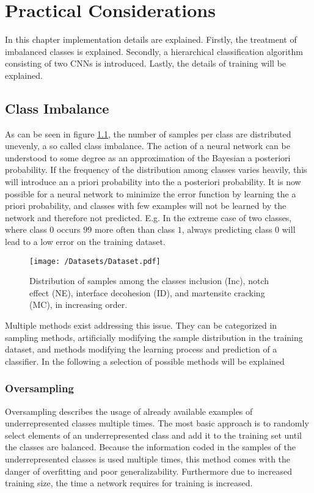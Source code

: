 \chapter{Practical Considerations}
\label{cha:PracticalConsiderations}

In this chapter implementation details are explained. Firstly, the treatment of imbalanced classes is explained. Secondly, a hierarchical classification algorithm consisting of two CNNs is introduced. Lastly, the details of training will be explained. 

\section{Class Imbalance}

As can be seen in figure \ref{fig:datasets}, the number of samples per class are distributed unevenly, a so called class imbalance. The action of a neural network can be understood to some degree as an approximation of the Bayesian a posteriori probability. If the frequency of the distribution among classes varies heavily, this will introduce an a priori probability into the a posteriori probability. It is now possible for a neural network to minimize the error function by learning the a priori probability, and classes with few examples will not be learned by the network and therefore not predicted. E.g. In the extreme case of two classes, where class $0$ occurs $99$ more often than class $1$, always predicting class $0$ will lead to a low error on the training dataset. \\

\begin{figure}[H]
\centering
\texttt{[image: /Datasets/Dataset.pdf]}
\caption{Distribution of samples among the classes inclusion (Inc), notch effect (NE), interface decohesion (ID), and martensite cracking (MC), in increasing order.}
\label{fig:datasets}
\end{figure}

Multiple methods exist addressing this issue. They can be categorized in sampling methods, artificially modifying the sample distribution in the training dataset, and methods modifying the learning process and prediction of a classifier. In the following a selection of possible methods will be explained

\subsection{Oversampling}
Oversampling describes the usage of already available examples of underrepresented classes multiple times. The most basic approach is to randomly select elements of an underrepresented class and add it to the training set until the classes are balanced. Because the information coded in the samples of the underrepresented classes is used multiple times, this method comes with the danger of overfitting and poor generalizability. Furthermore due to increased training size, the time a network requires for training is increased. 

